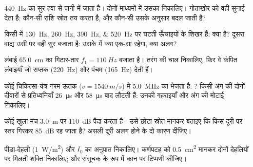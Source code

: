 \begin{exercise}[$\star\star$]\label{exo:g12:sound-acoustics:9}
\qty{440}{Hz} का सुर हवा से पानी में जाता है। दोनों माध्यमों में उसका
 निकालिए। गोताख़ोर को वही  सुनाई देता है:
कौन-सी राशि स्रोत तय करता है, और कौन-सी उसके अनुसार बदल जाती है?
\end{exercise}

\begin{exercise}[$\star\star$]\label{exo:g12:sound-acoustics:10}
किसी  में \qtylist{130;260;390;520}{Hz} पर घटती ऊँचाइयों के
शिखर हैं:  क्या है? दूसरा वाद्य उसी  पर वही
सुर बजाता है: उसके  में क्या एक-सा रहेगा, क्या अलग?
\end{exercise}

\begin{exercise}[$\star\star$]\label{exo:g12:sound-acoustics:11}
लंबाई \qty{65.0}{cm} का गिटार-तार $f_1 = \qty{110}{Hz}$ बजाता है। तरंग की चाल
निकालिए, फिर वे कंपित लंबाइयाँ जो सप्तक (\qty{220}{Hz}) और पंचम (\qty{165}{Hz}) देती
हैं।
\end{exercise}

\begin{exercise}[$\star\star\star$]\label{exo:g12:sound-acoustics:12}
कोई चिकित्सा-यंत्र नरम ऊतक ($v = \qty{1540}{m/s}$) में \qty{5.0}{MHz} का 
भेजता है: ? किसी अंग की दोनों दीवारों से
प्रतिध्वनियाँ \qty{26}{\micro s} और \qty{58}{\micro s} बाद लौटती हैं: उनकी गहराइयाँ और
अंग की मोटाई निकालिए।
\end{exercise}

\begin{exercise}[$\star\star\star$]\label{exo:g12:sound-acoustics:13}
कोई खुला मंच \qty{3.0}{m} पर \qty{110}{dB} पैदा करता है। उसे छोटा स्रोत मानकर बताइए कि
किस दूरी पर स्तर गिरकर \qty{85}{dB} रह जाता है? असली दूरी अलग होने के दो कारण
दीजिए।
\end{exercise}

\begin{exercise}[$\star\star\star$]\label{exo:g12:sound-acoustics:14}
पीड़ा-देहली (\qty{1}{W/m^2}) और $I_0$ का अनुपात निकालिए। कर्णपटह को \qty{0.5}{cm^2} मानकर
दोनों देहलियों पर मिलती शक्ति निकालिए; और संसूचक के रूप में कान पर
टिप्पणी कीजिए।
\end{exercise}

